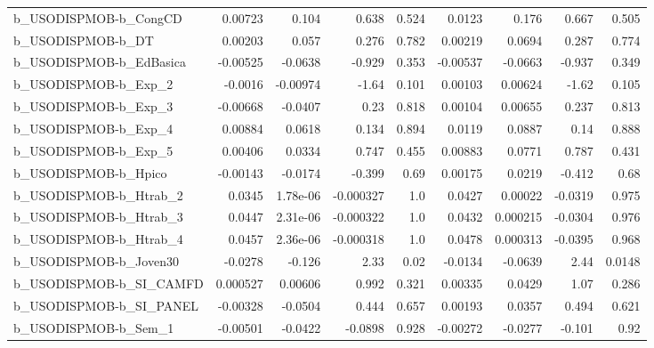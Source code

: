 \begin{tabular}{lrrrrrrrr}
b\_USODISPMOB-b\_CongCD      &     0.00723 &        0.104 &     0.638 &    0.524 &     0.0123 &       0.176 &        0.667 &         0.505 \\
b\_USODISPMOB-b\_DT          &     0.00203 &        0.057 &     0.276 &    0.782 &    0.00219 &      0.0694 &        0.287 &         0.774 \\
b\_USODISPMOB-b\_EdBasica    &    -0.00525 &      -0.0638 &    -0.929 &    0.353 &   -0.00537 &     -0.0663 &       -0.937 &         0.349 \\
b\_USODISPMOB-b\_Exp\_2       &     -0.0016 &     -0.00974 &     -1.64 &    0.101 &    0.00103 &     0.00624 &        -1.62 &         0.105 \\
b\_USODISPMOB-b\_Exp\_3       &    -0.00668 &      -0.0407 &      0.23 &    0.818 &    0.00104 &     0.00655 &        0.237 &         0.813 \\
b\_USODISPMOB-b\_Exp\_4       &     0.00884 &       0.0618 &     0.134 &    0.894 &     0.0119 &      0.0887 &         0.14 &         0.888 \\
b\_USODISPMOB-b\_Exp\_5       &     0.00406 &       0.0334 &     0.747 &    0.455 &    0.00883 &      0.0771 &        0.787 &         0.431 \\
b\_USODISPMOB-b\_Hpico       &    -0.00143 &      -0.0174 &    -0.399 &     0.69 &    0.00175 &      0.0219 &       -0.412 &          0.68 \\
b\_USODISPMOB-b\_Htrab\_2     &      0.0345 &     1.78e-06 & -0.000327 &      1.0 &     0.0427 &     0.00022 &      -0.0319 &         0.975 \\
b\_USODISPMOB-b\_Htrab\_3     &      0.0447 &     2.31e-06 & -0.000322 &      1.0 &     0.0432 &    0.000215 &      -0.0304 &         0.976 \\
b\_USODISPMOB-b\_Htrab\_4     &      0.0457 &     2.36e-06 & -0.000318 &      1.0 &     0.0478 &    0.000313 &      -0.0395 &         0.968 \\
b\_USODISPMOB-b\_Joven30     &     -0.0278 &       -0.126 &      2.33 &     0.02 &    -0.0134 &     -0.0639 &         2.44 &        0.0148 \\
b\_USODISPMOB-b\_SI\_CAMFD    &    0.000527 &      0.00606 &     0.992 &    0.321 &    0.00335 &      0.0429 &         1.07 &         0.286 \\
b\_USODISPMOB-b\_SI\_PANEL    &    -0.00328 &      -0.0504 &     0.444 &    0.657 &    0.00193 &      0.0357 &        0.494 &         0.621 \\
b\_USODISPMOB-b\_Sem\_1       &    -0.00501 &      -0.0422 &   -0.0898 &    0.928 &   -0.00272 &     -0.0277 &       -0.101 &          0.92 \\

\end{tabular}
